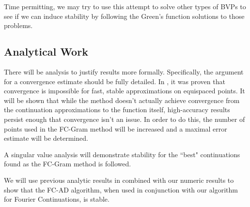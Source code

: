 \documentclass[11pt]{amsart}
\begin{document}
Time permitting, we may try to use this attempt to solve other types of BVPs to see if we can induce stability by following the Green's function solutions to those problems.  

\subsection{Analytical Work} 
There will be analysis to justify results more formally.  
Specifically, the argument for a convergence estimate should be fully detailed.  In \cite{Platte}, it was proven that convergence is impossible for fast, stable approximations on equispaced points.  It will be shown that while the method doesn't actually achieve convergence from the continuation approximations to the function itself, high-accuracy results persist enough that convergence isn't an issue. In order to do this, the number of points used in the FC-Gram method will be increased and a maximal error estimate will be determined.   

A singular value analysis will demonstrate stability for the ``best" continuations found as the FC-Gram method is followed.   

We will use previous analytic results in \cite{FCAD2} combined with our numeric results to show that the FC-AD algorithm, when used in conjunction with our algorithm for Fourier Continuations, is stable. 
\newpage



\end{document}
